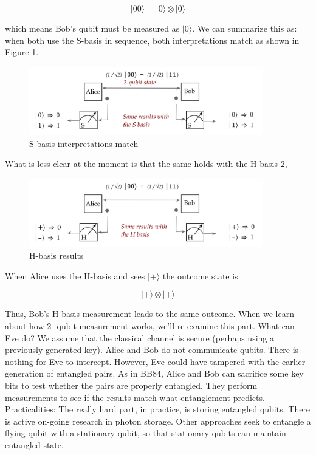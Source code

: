 \documentclass[main.tex]{subfiles}
\begin{document}
    $$
    |00\rangle=|0\rangle \otimes|0\rangle
    $$
    
    which means Bob's qubit must be measured as $|0\rangle$. We can summarize this as: when both use the S-basis in sequence, both interpretations match as shown in Figure \ref{fig:18ekert8}.
    
    \begin{figure}
        \centering
        \includegraphics[width=4in]{notes/figs/n06/18ekert8.png}
        \caption{S-basis interpretations match}
        \label{fig:18ekert8}
    \end{figure}    
    
    What is less clear at the moment is that the same holds with the H-basis \ref{fig:19ekert9},
    
    \begin{figure}
        \centering
        \includegraphics[width=4in]{notes/figs/n06/19ekert9.png}
        \caption{H-basis results}
        \label{fig:19ekert9}
    \end{figure} 
    
    When Alice uses the H-basis and sees $|+\rangle$ the outcome state is:
    
    $$
    |+\rangle \otimes|+\rangle
    $$
    
    Thus, Bob's H-basis measurement leads to the same outcome. When we learn about how 2 -qubit measurement works, we'll re-examine this part. What can Eve do? We assume that the classical channel is secure (perhaps using a previously generated key). Alice and Bob do not communicate qubits. There is nothing for Eve to intercept. However, Eve could have tampered with the earlier generation of entangled pairs. As in BB84, Alice and Bob can sacrifice some key bits to test whether the pairs are properly entangled. They perform measurements to see if the results match what entanglement predicts. Practicalities: The really hard part, in practice, is storing entangled qubits. There is active on-going research in photon storage. Other approaches seek to entangle a flying qubit with a stationary qubit, so that stationary qubits can maintain entangled state.
\end{document}
